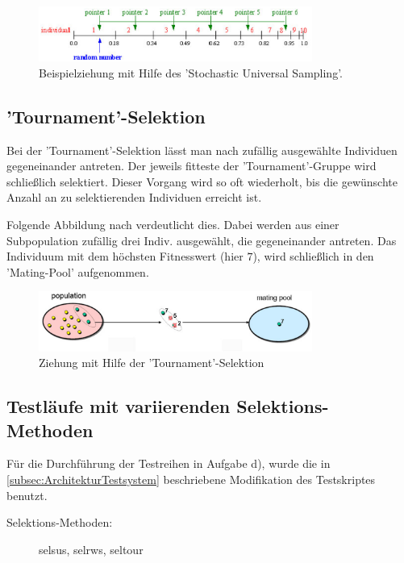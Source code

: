 \begin{figure} 
  \centering
  \includegraphics[width=0.8\textwidth]{../images/picSelsusAuswahl}
  \caption{Beispielziehung mit Hilfe des 'Stochastic Universal Sampling'.}
  \label{fig:SelsusAuswahl}
\end{figure}

\subsection{'Tournament'-Selektion}
Bei der 'Tournament'-Selektion lässt man nach \cite{url:geatbx-documentation}
zufällig ausgewählte Individuen gegeneinander antreten. Der jeweils fitteste
der 'Tournament'-Gruppe wird schließlich selektiert. Dieser Vorgang wird so
oft wiederholt, bis die gewünschte Anzahl an zu selektierenden Individuen
erreicht ist.

Folgende Abbildung nach \cite{url:RouletteSelsus} verdeutlicht dies.
Dabei werden aus einer Subpopulation zufällig drei Indiv. ausgewählt, die
gegeneinander antreten. Das Individuum mit dem höchsten Fitnesswert (hier $7$),
wird schließlich in den 'Mating-Pool' aufgenommen.

\begin{figure} 
  \centering
  \includegraphics[width=0.8\textwidth]{../images/picTournamentAuswahl}
  \caption{Ziehung mit Hilfe der 'Tournament'-Selektion}
  \label{fig:TournamentAuswahl}
\end{figure}

\subsection{Testläufe mit variierenden Selektions-Methoden}
\label{subsec:TestlaufeSelektionsmethoden}
Für die Durchführung der Testreihen in Aufgabe d), wurde die in 
\ref{subsec:ArchitekturTestsystem} beschriebene Modifikation des
Testskriptes benutzt. 

\begin{description}
  \item[Selektions-Methoden:] selsus, selrws, seltour
\end{description}

